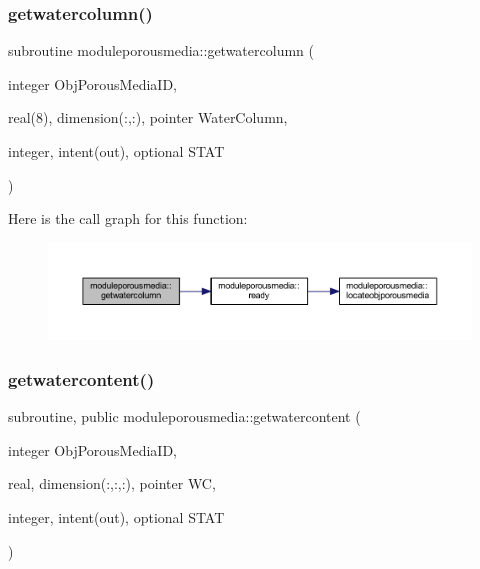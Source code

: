 \subsubsection{\texorpdfstring{getwatercolumn()}{getwatercolumn()}}
{\footnotesize\ttfamily subroutine moduleporousmedia\+::getwatercolumn (\begin{DoxyParamCaption}\item[{integer}]{Obj\+Porous\+Media\+ID,  }\item[{real(8), dimension(\+:,\+:), pointer}]{Water\+Column,  }\item[{integer, intent(out), optional}]{S\+T\+AT }\end{DoxyParamCaption})\hspace{0.3cm}{\ttfamily [private]}}

Here is the call graph for this function\+:\nopagebreak
\begin{figure}[H]
\begin{center}
\leavevmode
\includegraphics[width=350pt]{namespacemoduleporousmedia_a9423063423e189eb443c264d3302f41d_cgraph}
\end{center}
\end{figure}
\mbox{\label{namespacemoduleporousmedia_a5b9d7f2adce9fea213bdc41bdb432a9f}} 
\subsubsection{\texorpdfstring{getwatercontent()}{getwatercontent()}}
{\footnotesize\ttfamily subroutine, public moduleporousmedia\+::getwatercontent (\begin{DoxyParamCaption}\item[{integer}]{Obj\+Porous\+Media\+ID,  }\item[{real, dimension(\+:,\+:,\+:), pointer}]{WC,  }\item[{integer, intent(out), optional}]{S\+T\+AT }\end{DoxyParamCaption})}

